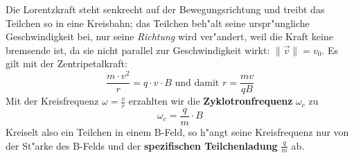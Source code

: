 Die Lorentzkraft steht senkrecht auf der Bewegungsrichtung und treibt
das Teilchen so in eine Kreisbahn; das Teilchen beh"alt seine
urspr"ungliche Geschwindigkeit bei, nur seine \emph{Richtung} wird
ver"andert, weil die Kraft keine bremsende ist, da sie nicht parallel
zur Geschwindigkeit wirkt: $\| \vec v \| = v_0$. Es gilt mit der
Zentripetalkraft:
\begin{equation}
   \label{eq:325}
   \frac{m \cdot v^2}{r} = q \cdot v \cdot B \text{ und damit } r =
   \frac{m v}{q B}
\end{equation}
Mit der Kreisfrequenz $\omega = \frac{v}{r}$ erzahlten wir die
\textbf{Zyklotronfrequenz} $\omega_c$ zu
\begin{equation}
   \label{eq:326}
   \boxed{\omega_c = \frac{q}{m} \cdot B }
\end{equation}
Kreiselt also ein Teilchen in einem B-Feld, so h"angt seine
Kreisfrequenz nur von der St"arke des B-Felds und der
\textbf{spezifischen Teilchenladung} $\frac{q}{m}$ ab.


